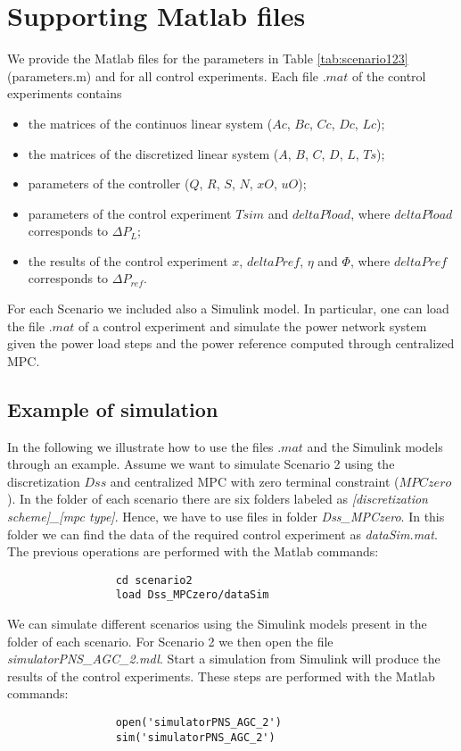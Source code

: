 \documentclass[a4paper]{article}
\begin{document}
          
     \section{Supporting Matlab files}

         We provide the Matlab files for the parameters in Table \ref{tab:scenario123} (\mbox{parameters.m}) and for all control experiments. Each file $.mat$ of the control experiments contains 
         \begin{itemize}
         \item the matrices of the continuos linear system ($Ac$, $Bc$, $Cc$, $Dc$, $Lc$);
         \item the matrices of the discretized linear system ($A$, $B$, $C$, $D$, $L$, $Ts$);
         \item parameters of the controller ($Q$, $R$, $S$, $N$, $xO$, $uO$);
         \item parameters of the control experiment  $Tsim$ and $deltaPload$, where $deltaPload$ corresponds to $\Delta P_L$;
         \item the results of the control experiment $x$, $deltaPref$, $\eta$ and $\Phi$, where $deltaPref$ corresponds to $\Delta P_{ref}$.
         \end{itemize}
         
         For each Scenario we included also a Simulink model. In particular, one can load the file $.mat$ of a control experiment and simulate the power network system given the power load steps and the power reference computed through centralized MPC.

          \subsection{Example of simulation}
               In the following we illustrate how to use the files $.mat$ and the Simulink models through an example. Assume we want to simulate Scenario 2 using the discretization $Dss$ and centralized MPC with zero terminal constraint ($MPCzero$). In the folder of each scenario there are six folders labeled as \emph{[discretization scheme]\_[mpc type]}. Hence, we have to use files in folder \emph{Dss\_MPCzero}. In this folder we can find the data of the required control experiment as \emph{dataSim.mat}. The previous operations are performed with the Matlab commands:
               \begin{lstlisting}
                 cd scenario2
                 load Dss_MPCzero/dataSim
               \end{lstlisting}
               We can simulate different scenarios using the Simulink models present in the folder of each scenario. For Scenario 2 we then open the file \emph{simulatorPNS\_AGC\_2.mdl}. Start a simulation from Simulink will produce the results of the control experiments. These steps are performed with the Matlab commands:
               \begin{lstlisting}
                 open('simulatorPNS_AGC_2')
                 sim('simulatorPNS_AGC_2')
               \end{lstlisting}
\end{document}

